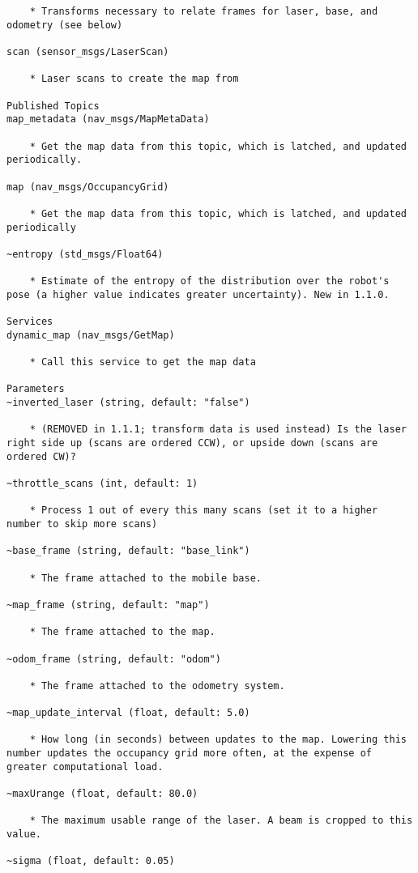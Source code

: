 \begin{verbatim}
    * Transforms necessary to relate frames for laser, base, and odometry (see below) 

scan (sensor_msgs/LaserScan)

    * Laser scans to create the map from 

Published Topics
map_metadata (nav_msgs/MapMetaData)

    * Get the map data from this topic, which is latched, and updated periodically. 

map (nav_msgs/OccupancyGrid)

    * Get the map data from this topic, which is latched, and updated periodically 

~entropy (std_msgs/Float64)

    * Estimate of the entropy of the distribution over the robot's pose (a higher value indicates greater uncertainty). New in 1.1.0. 

Services
dynamic_map (nav_msgs/GetMap)

    * Call this service to get the map data 

Parameters
~inverted_laser (string, default: "false")

    * (REMOVED in 1.1.1; transform data is used instead) Is the laser right side up (scans are ordered CCW), or upside down (scans are ordered CW)? 

~throttle_scans (int, default: 1)

    * Process 1 out of every this many scans (set it to a higher number to skip more scans) 

~base_frame (string, default: "base_link")

    * The frame attached to the mobile base. 

~map_frame (string, default: "map")

    * The frame attached to the map. 

~odom_frame (string, default: "odom")

    * The frame attached to the odometry system. 

~map_update_interval (float, default: 5.0)

    * How long (in seconds) between updates to the map. Lowering this number updates the occupancy grid more often, at the expense of greater computational load. 

~maxUrange (float, default: 80.0)

    * The maximum usable range of the laser. A beam is cropped to this value. 

~sigma (float, default: 0.05)


\end{verbatim}
